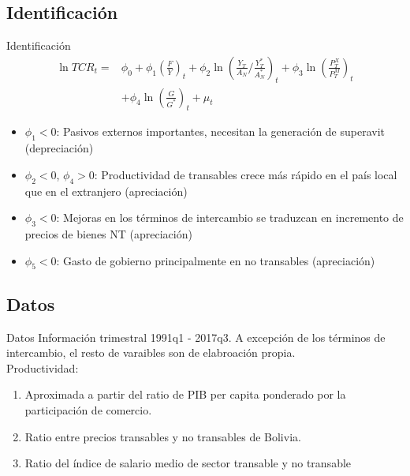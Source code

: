 \documentclass{beamer}
\begin{document}
\subsection[Identificación]{Identificación}
\begin{frame}{Identificación}
\small{
\begin{align}
\ln TCR_t=&\phi_0+\phi_1\left(\frac{F}{Y}\right)_t+\phi_2\ln\left(\frac{Y_T}{A_N} / \frac{Y_T^*}{A_N^*}\right)_t+\phi_3\ln\left(\frac{P_T^X}{P_T^M}\right)_t\\\nonumber&+\phi_4\ln\left(\frac{G}{G^*}\right)_t+\mu_t
\end{align}
}
\begin{itemize}
\item $\phi_1<0$: Pasivos externos importantes, necesitan la generación de superavit (depreciación)
\item $\phi_2<0$, $\phi_4>0$: Productividad de transables crece más rápido en el país local que en el extranjero (apreciación)
\item $\phi_3<0$: Mejoras en los términos de intercambio se traduzcan en incremento de precios de bienes NT (apreciación)
\item $\phi_5<0$: Gasto de gobierno principalmente en no transables (apreciación)
\end{itemize}
\end{frame}

\subsection[Datos]{Datos}
\begin{frame}{Datos}
Información trimestral 1991q1 - 2017q3. A excepción de los términos de intercambio, el resto de varaibles son de elabroación propia.\\
Productividad:
\begin{enumerate}
\item Aproximada a partir del ratio de PIB per capita ponderado por la participación de comercio. 
\item Ratio entre precios transables y no transables de Bolivia. 
\item Ratio del índice de salario medio de sector transable y no transable
\end{enumerate}
\end{frame}
\end{document}

